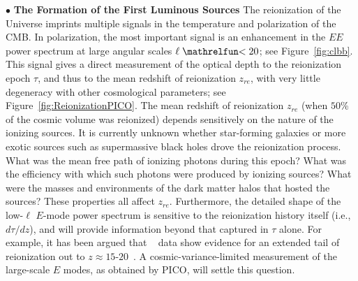 \documentclass[PICOReport.tex]{subfiles}
\begin{document}

 $\bullet$ {\bf The Formation of the First Luminous Sources} \hspace{0.1in} \label{luminoussources}  The reionization of the Universe imprints multiple signals in the temperature and polarization of the CMB.  In polarization, the most important signal is an enhancement in the $EE$ power spectrum at large angular scales $\ell \simlt 20$; see Figure~\ref{fig:clbb}. This signal gives a direct measurement of the optical depth to the reionization epoch $\tau$, and thus to the mean redshift of reionization $z_{re}$, with very little degeneracy with other cosmological parameters; see Figure~\ref{fig:ReionizationPICO}. The mean redshift of reionization $z_{re}$ (when $50$\% of the cosmic volume was reionized) depends sensitively on the nature of the ionizing sources.  It is currently unknown whether star-forming galaxies or more exotic sources such as supermassive black holes drove the reionization process.  What was the mean free path of ionizing photons during this epoch?  What was the efficiency with which such photons were produced by ionizing sources?  What were the masses and environments of the dark matter halos that hosted the sources?  These properties all affect $z_{re}$.
Furthermore, the detailed shape of the low-$\ell$ $E$-mode power spectrum is sensitive to the reionization history 
itself (i.e., $d\tau/dz$), and will provide information beyond that captured in $\tau$ alone.  For example, it has been 
argued that \planck~ data show evidence for an extended tail of reionization out to $z \approx 15$-$20$~\citep{Miranda2017}.  
A cosmic-variance-limited measurement of the large-scale $E$ modes, as obtained by PICO, will settle this question.  
 
\end{document}
